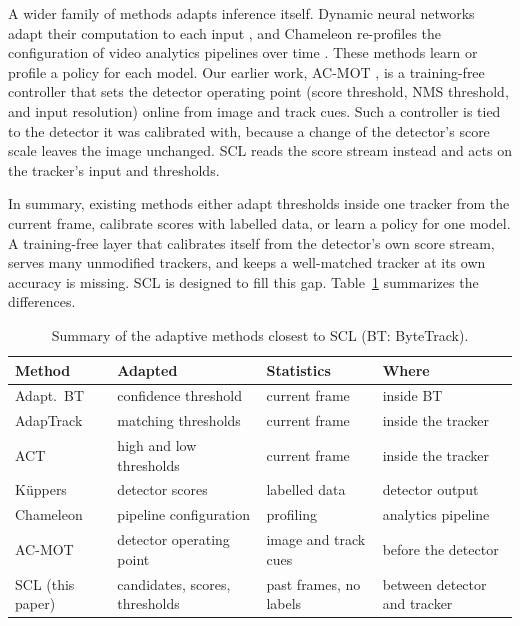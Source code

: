 \documentclass[pdflatex,sn-mathphys-num,iicol]{sn-jnl}
\newcommand{\scl}{SCL}
\begin{document}
A wider family of methods adapts inference itself. Dynamic neural networks
adapt their computation to each input \cite{han2022dynamic}, and Chameleon
re-profiles the configuration of video analytics pipelines over time
\cite{jiang2018chameleon}. These methods learn or profile a policy for each
model. Our earlier work, AC-MOT \cite{ismail2026acmot}, is a training-free
controller that sets the detector operating point (score threshold, NMS
threshold, and input resolution) online from image and track cues. Such a
controller is tied to the detector it was calibrated with, because a change
of the detector's score scale leaves the image unchanged. \scl{} reads the
score stream instead and acts on the tracker's input and thresholds.

In summary, existing methods either adapt thresholds inside one tracker from
the current frame, calibrate scores with labelled data, or learn a policy for
one model. A training-free layer that calibrates itself from the detector's
own score stream, serves many unmodified trackers, and keeps a well-matched
tracker at its own accuracy is missing. \scl{} is designed to fill this gap.
Table~\ref{tab:related} summarizes the differences.

\begin{table}[t]
\caption{Summary of the adaptive methods closest to \scl{} (BT: ByteTrack).}
\label{tab:related}
\centering\footnotesize
\setlength{\tabcolsep}{3pt}
\begin{tabular}{@{}>{\raggedright\arraybackslash}p{17mm}>{\raggedright\arraybackslash}p{18mm}>{\raggedright\arraybackslash}p{15mm}>{\raggedright\arraybackslash}p{18mm}@{}}
\toprule
Method & Adapted & Statistics & Where\\
\midrule
Adapt.\ BT \cite{ma2023adaptivebytetrack} & confidence threshold & current frame & inside BT\\
AdapTrack \cite{shim2024adaptrack} & matching thresholds & current frame & inside the tracker\\
ACT \cite{act2026adaptive} & high and low thresholds & current frame & inside the tracker\\
K{\"u}ppers \cite{kuppers2020detcalib} & detector scores & labelled data & detector output\\
Chameleon \cite{jiang2018chameleon} & pipeline configuration & profiling & analytics pipeline\\
AC-MOT \cite{ismail2026acmot} & detector operating point & image and track cues & before the detector\\
\scl{} (this paper) & candidates, scores, thresholds & past frames, no labels & between detector and tracker\\
\bottomrule
\end{tabular}
\end{table}
\end{document}

